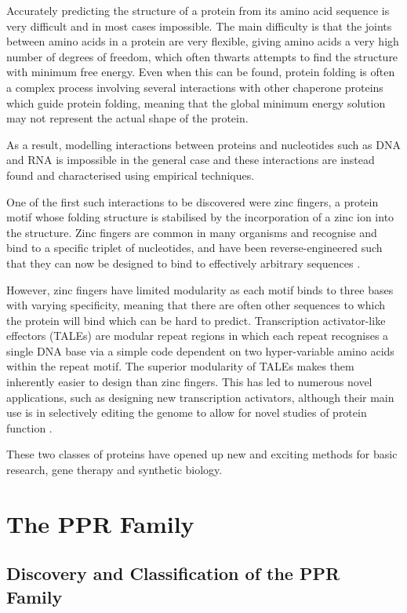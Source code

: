 Accurately predicting the structure of a protein from its amino acid sequence 
is very difficult and in most cases impossible.
The main difficulty is that the joints between amino acids in a protein are
very flexible, giving amino acids a very high number of degrees of freedom,
which often thwarts attempts to find the structure with minimum free energy.
Even when this can be found, protein folding is often a complex process
involving several interactions with other chaperone proteins which guide
protein folding, meaning that the global minimum energy solution may not 
represent the actual shape of the protein.

As a result, modelling interactions between proteins and nucleotides such as
DNA and RNA is impossible in the general case and these interactions are
instead found and characterised using empirical techniques.

One of the first such interactions to be discovered were zinc fingers, a
protein motif whose folding structure is stabilised by the incorporation of a
zinc ion into the structure.
Zinc fingers are common in many organisms and recognise and bind to a specific 
triplet of nucleotides, and have been reverse-engineered such that they can now
be designed to bind to effectively arbitrary sequences \citep{Gaj2013}.

However, zinc fingers have limited modularity as each motif binds to three
bases with varying specificity, meaning that there are often other sequences to
which the protein will bind which can be hard to predict.
Transcription activator-like effectors (TALEs) are modular repeat regions in
which each repeat recognises a single DNA base via a simple code dependent on
two hyper-variable amino acids within the repeat motif.
The superior modularity of TALEs makes them inherently easier to design than 
zinc fingers.
This has led to numerous novel applications, such as designing new 
transcription activators, although their main use is in selectively editing 
the genome to allow for novel studies of protein function \citep{Sun2013}.

These two classes of proteins have opened up new and exciting methods for basic
research, gene therapy and synthetic biology.

\section{The PPR Family}
\label{sec:review_PPR}
\subsection{Discovery and Classification of the PPR Family}


